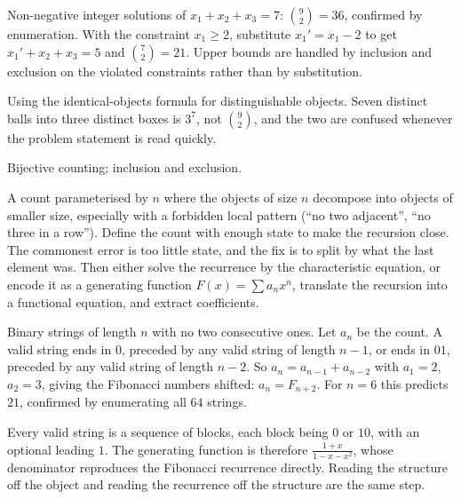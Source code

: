 \begin{worked}
Non-negative integer solutions of $x_{1}+x_{2}+x_{3}=7$: $\binom{9}{2}=36$, confirmed by enumeration. With the constraint $x_{1}\geq2$, substitute $x_{1}'=x_{1}-2$ to get $x_{1}'+x_{2}+x_{3}=5$ and $\binom{7}{2}=21$. Upper bounds are handled by inclusion and exclusion on the violated constraints rather than by substitution.
\end{worked}

\begin{trap}
Using the identical-objects formula for distinguishable objects. Seven distinct balls into three distinct boxes is $3^{7}$, not $\binom{9}{2}$, and the two are confused whenever the problem statement is read quickly.
\end{trap}

\begin{seealsob}Bijective counting; inclusion and exclusion.\end{seealsob}

\cue A count parameterised by $n$ where the objects of size $n$ decompose into objects of smaller size, especially with a forbidden local pattern (``no two adjacent'', ``no three in a row'').
\method Define the count with enough state to make the recursion close. The commonest error is too little state, and the fix is to split by what the last element was. Then either solve the recurrence by the characteristic equation, or encode it as a generating function $F(x)=\sum a_{n}x^{n}$, translate the recursion into a functional equation, and extract coefficients.

\begin{worked}
Binary strings of length $n$ with no two consecutive ones. Let $a_{n}$ be the count. A valid string ends in $0$, preceded by any valid string of length $n-1$, or ends in $01$, preceded by any valid string of length $n-2$. So $a_{n}=a_{n-1}+a_{n-2}$ with $a_{1}=2$, $a_{2}=3$, giving the Fibonacci numbers shifted: $a_{n}=F_{n+2}$. For $n=6$ this predicts $21$, confirmed by enumerating all $64$ strings.
\end{worked}

\begin{worked}
Every valid string is a sequence of blocks, each block being $0$ or $10$, with an optional leading $1$. The generating function is therefore $\frac{1+x}{1-x-x^{2}}$, whose denominator reproduces the Fibonacci recurrence directly. Reading the structure off the object and reading the recurrence off the structure are the same step.
\end{worked}

